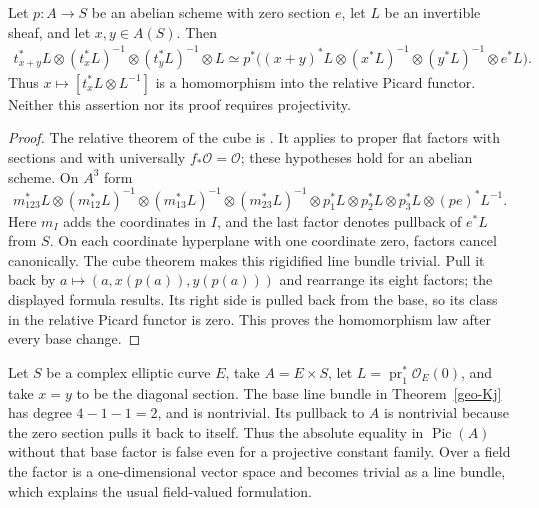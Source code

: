\begin{theorem}
\label{geo-Kj}
Let $p:A\to S$ be an abelian scheme with zero section $e$, let $L$ be an
invertible sheaf, and let $x,y\in A(S)$. Then
\begin{align*}
 t_{x+y}^*L\otimes(t_x^*L)^{-1}\otimes(t_y^*L)^{-1}\otimes L
 \simeq p^*\bigl((x+y)^*L\otimes(x^*L)^{-1}
 \otimes(y^*L)^{-1}\otimes e^*L\bigr).
\end{align*}
Thus $x\mapsto[t_x^*L\otimes L^{-1}]$ is a homomorphism into the relative
Picard functor. Neither this assertion nor its proof requires projectivity.
\end{theorem}
\begin{proof}
The relative theorem of the cube is
\cite[VII, Theorem 3.1, pp.~VII-6--VII-8]{RaynaudOrsay1967}. It applies to
proper flat factors with sections and with universally
$f_*\mathcal O=\mathcal O$; these hypotheses hold for an abelian scheme.
On $A^3$ form
\[
 m_{123}^*L\otimes(m_{12}^*L)^{-1}\otimes(m_{13}^*L)^{-1}
 \otimes(m_{23}^*L)^{-1}\otimes p_1^*L\otimes p_2^*L
 \otimes p_3^*L\otimes(p e)^*L^{-1}.
\]
Here $m_I$ adds the coordinates in $I$, and the last factor denotes
pullback of $e^*L$ from $S$. On each coordinate hyperplane with one
coordinate zero, factors cancel canonically. The cube theorem makes this
rigidified line bundle trivial. Pull it back by
$a\mapsto(a,x(p(a)),y(p(a)))$ and rearrange its eight factors; the
displayed formula results. Its right side is pulled back from the base,
so its class in the relative Picard functor is zero. This proves the
homomorphism law after every base change.
\end{proof}

\begin{example}
\label{geo-Kj-base}
Let $S$ be a complex elliptic curve $E$, take $A=E\times S$, let
$L=\operatorname{pr}_1^*\mathcal O_E(0)$, and take $x=y$ to be the
diagonal section. The base line bundle in Theorem~\ref{geo-Kj} has degree
$4-1-1=2$, and is nontrivial. Its pullback to $A$ is nontrivial because
the zero section pulls it back to itself. Thus the absolute equality in
$\operatorname{Pic}(A)$ without that base factor is false even for a
projective constant family. Over a field the factor is a one-dimensional
vector space and becomes trivial as a line bundle, which explains the
usual field-valued formulation.
\end{example}
